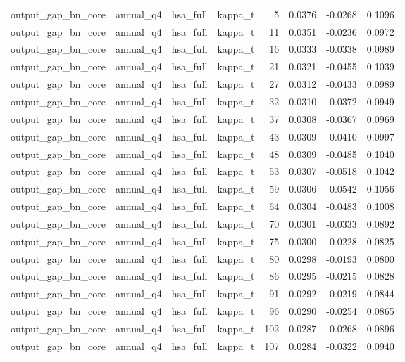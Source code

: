 \begin{tabular}{llllrrrr}
output\_gap\_bn\_core & annual\_q4 & hsa\_full & kappa\_t & 5 & 0.0376 & -0.0268 & 0.1096 \\
output\_gap\_bn\_core & annual\_q4 & hsa\_full & kappa\_t & 11 & 0.0351 & -0.0236 & 0.0972 \\
output\_gap\_bn\_core & annual\_q4 & hsa\_full & kappa\_t & 16 & 0.0333 & -0.0338 & 0.0989 \\
output\_gap\_bn\_core & annual\_q4 & hsa\_full & kappa\_t & 21 & 0.0321 & -0.0455 & 0.1039 \\
output\_gap\_bn\_core & annual\_q4 & hsa\_full & kappa\_t & 27 & 0.0312 & -0.0433 & 0.0989 \\
output\_gap\_bn\_core & annual\_q4 & hsa\_full & kappa\_t & 32 & 0.0310 & -0.0372 & 0.0949 \\
output\_gap\_bn\_core & annual\_q4 & hsa\_full & kappa\_t & 37 & 0.0308 & -0.0367 & 0.0969 \\
output\_gap\_bn\_core & annual\_q4 & hsa\_full & kappa\_t & 43 & 0.0309 & -0.0410 & 0.0997 \\
output\_gap\_bn\_core & annual\_q4 & hsa\_full & kappa\_t & 48 & 0.0309 & -0.0485 & 0.1040 \\
output\_gap\_bn\_core & annual\_q4 & hsa\_full & kappa\_t & 53 & 0.0307 & -0.0518 & 0.1042 \\
output\_gap\_bn\_core & annual\_q4 & hsa\_full & kappa\_t & 59 & 0.0306 & -0.0542 & 0.1056 \\
output\_gap\_bn\_core & annual\_q4 & hsa\_full & kappa\_t & 64 & 0.0304 & -0.0483 & 0.1008 \\
output\_gap\_bn\_core & annual\_q4 & hsa\_full & kappa\_t & 70 & 0.0301 & -0.0333 & 0.0892 \\
output\_gap\_bn\_core & annual\_q4 & hsa\_full & kappa\_t & 75 & 0.0300 & -0.0228 & 0.0825 \\
output\_gap\_bn\_core & annual\_q4 & hsa\_full & kappa\_t & 80 & 0.0298 & -0.0193 & 0.0800 \\
output\_gap\_bn\_core & annual\_q4 & hsa\_full & kappa\_t & 86 & 0.0295 & -0.0215 & 0.0828 \\
output\_gap\_bn\_core & annual\_q4 & hsa\_full & kappa\_t & 91 & 0.0292 & -0.0219 & 0.0844 \\
output\_gap\_bn\_core & annual\_q4 & hsa\_full & kappa\_t & 96 & 0.0290 & -0.0254 & 0.0865 \\
output\_gap\_bn\_core & annual\_q4 & hsa\_full & kappa\_t & 102 & 0.0287 & -0.0268 & 0.0896 \\
output\_gap\_bn\_core & annual\_q4 & hsa\_full & kappa\_t & 107 & 0.0284 & -0.0322 & 0.0940 \\

\end{tabular}
